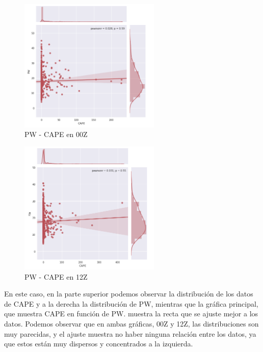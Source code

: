 \documentclass[a4paper]{article}
\begin{document}
\begin{figure}[ht!]
 \centering
  \includegraphics[width=0.6\textwidth]{00Z_Joinplot.png}
  \caption{PW - CAPE en 00Z}
\end{figure}
\begin{figure}[ht!]
 \centering
  \includegraphics[width=0.6\textwidth]{12Z_Joinplot.png}
  \caption{PW - CAPE en 12Z}
\end{figure}

En este caso, en la parte superior podemos observar la distribución de los datos de CAPE y a la derecha la distribución de PW, mientras que la gráfica principal, que muestra CAPE en función de PW. muestra la recta que se ajuste mejor a los datos. Podemos observar que en ambas gráficas, 00Z y 12Z, las distribuciones son muy parecidas, y el ajuste muestra no haber ninguna relación entre los datos, ya que estos están muy dispersos y concentrados a la izquierda. 
\end{document}
